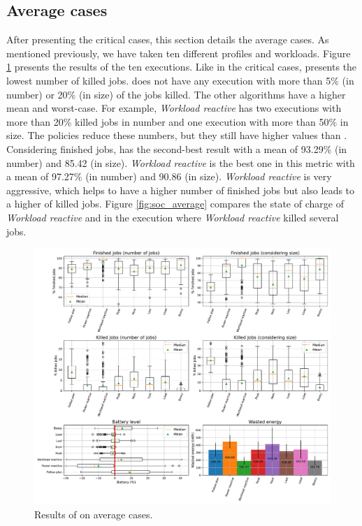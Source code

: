 \clearpage

\subsection{Average cases}

After presenting the critical cases, this section details the average cases. As mentioned previously, we have taken ten different profiles and workloads. Figure \ref{fig:beasy_average} presents the results of the ten executions. Like in the critical cases, \emph{\systemName} presents the lowest number of killed jobs. \emph{\systemName} does not have any execution with more than 5\% (in number) or 20\% (in size) of the jobs killed. The other algorithms have a higher mean and worst-case. For example, \emph{Workload reactive} has two executions with more than 20\% killed jobs in number and one execution with more than 50\% in size. The policies reduce these numbers, but they still have higher values than \emph{\systemName}. Considering finished jobs, \emph{\systemName} has the second-best result with a mean of 93.29\% (in number) and 85.42 (in size). \emph{Workload reactive} is the best one in this metric with a mean of 97.27\% (in number) and 90.86 (in size). \emph{Workload reactive} is very aggressive, which helps to have a higher number of finished jobs but also leads to a higher of killed jobs. Figure \ref{fig:soc_average} compares the state of charge of \emph{Workload reactive} and \emph{\systemName} in the execution where \emph{Workload reactive} killed several jobs. 

\begin{figure}[!htb]
    \centering
    \includegraphics[scale=0.39]{Images/Heuristic/100_cases.pdf}
    \caption{Results of \emph{\systemName} on average cases.}
    \label{fig:beasy_average}
\end{figure}

